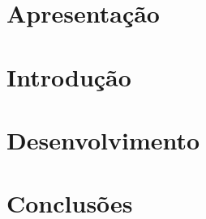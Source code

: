 


\chapter{Apresentação}

\chapter{Introdução} %


\chapter{Desenvolvimento}


\chapter{Conclusões}


